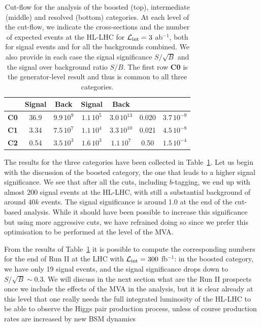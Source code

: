 \begin{table}[t]
\begin{tabular}{c|c|c|c|c|c|c}
      &    Signal & Back   &  Signal  & Back
    &   & \\
    \hline
       {\bf C0}  &  36.9  & $9.9\,10^{9}$ & $1.1\,10^5$ & $3.0\,10^{13}$  &  0.020 & $3.7\,10^{-9}$\\
        {\bf C1}  &   3.34    & $7.5\,10^{7}$    & $1.1\,10^4$    & $3.3\,10^{10}$     & 0.021     & $4.5\,10^{-8}$  \\
        {\bf C2}  &   0.54    &  $3.5\,10^{3}$   &  $1.6\,10^{3}$   &   $1.1\,10^{7}$   & 0.50     &  $1.5\,10^{-4}$ \\
        \hline
  \end{tabular}
  \caption{\small Cut-flow for the analysis of the boosted (top),
    intermediate (middle) and resolved (bottom)
    categories.
    At each level of the cut-flow, we indicate the cross-sections and the number of
    expected events at the HL-LHC for $\mathcal{L}_{\rm int}=3$ ab$^{-1}$, both for
    signal events and for all the backgrounds combined.
    We also provide in each case the
    signal significance $S/\sqrt{B}$ and the signal
    over background ratio $S/B$.
    The first row {\bf C0} is the generator-level result and thus is common
    to all three categories.
    \label{table:cutflow}
  }
\end{table}


The results for the three categories have been collected in
Table~\ref{table:cutflow}.
%
Let us begin with the discussion of the boosted category, the one that
leads to a higher signal significance.
%
We see that after all the cuts, including $b$-tagging,
we end up with almost 200 signal events at the HL-LHC, with
still a substantial background of around $40k$ events.
%
The signal significance is around 1.0 at the end of the
cut-based analysis.
%
While it should have been possible to increase this significance
but using more aggressive cuts, we have refrained doing so
since we prefer this optimisation to be performed at the level of
the MVA.


From the results of Table~\ref{table:cutflow}
it is possible to compute the corresponding numbers
for the end of Run II at the LHC with
$\mathcal{L}_{\rm int}=300$ fb$^{-1}$: in the boosted category,
we have only
19 signal events, and the signal significance drops down to
$S/\sqrt{B}\sim 0.3$.
%
We will discuss in the next section what are the Run II prospects
once we include the effects of the MVA in the analysis, but
it is clear already at this level that one really needs the full
integrated luminosity of the HL-LHC to be able to observe
the Higgs pair production process, unless  of course production rates are
increased by new BSM dynamics

